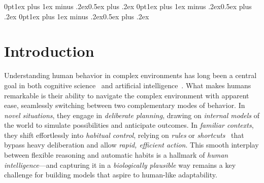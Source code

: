 \documentclass{article} %
\begin{document}
\titlespacing*{\section}
{0pt}{1ex plus 1ex minus .2ex}{0.5ex plus .2ex}
\titlespacing*{\subsection}
{0pt}{1ex plus 1ex minus .2ex}{0.5ex plus .2ex}
\titlespacing*{\subsubsection}
{0pt}{1ex plus 1ex minus .2ex}{0.5ex plus .2ex}

\setlength{\abovedisplayskip}{1pt}
\setlength{\abovedisplayshortskip}{0pt}
\setlength{\belowdisplayskip}{1pt}
\setlength{\floatsep}{1.5ex}
\setlength{\textfloatsep}{1.5ex}
\setlength{\parskip}{0.5ex}

\section{Introduction}
\label{sec:intro}

Understanding human behavior in complex environments has long been a central goal in both cognitive science~\citep{pylyshyn1980computation} and artificial intelligence~\citep{leichtmann2023effects}. What makes humans remarkable is their ability to navigate the complex environment with apparent ease, seamlessly switching between two complementary modes of behavior. In \emph{novel situations}, they engage in \emph{deliberate planning}, drawing on \emph{internal models} of the world to simulate possibilities and anticipate outcomes. In \emph{familiar contexts}, they shift effortlessly into \emph{habitual control}, relying on \emph{rules} or \emph{shortcuts}~\citep{neal2012habits} that bypass heavy deliberation and allow \emph{rapid, efficient action}. This smooth interplay between flexible reasoning and automatic habits is a hallmark of \emph{human intelligence}—and capturing it in a \emph{biologically plausible} way remains a key challenge for building models that aspire to human-like adaptability.
\end{document}
